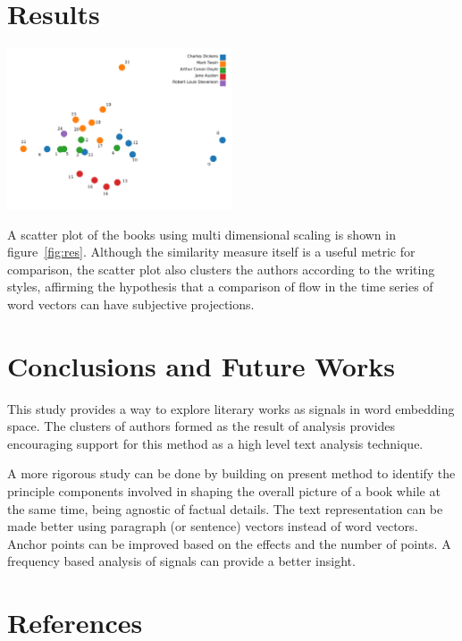 \documentclass[%
 aip,
rsi,%
 amsmath,amssymb,
 reprint,%
author-year,
groupedaddress
]{revtex4-1}
\begin{document}
\section{\label{res}Results}

\begin{center}
  \includegraphics[width=0.5\textwidth]{res}
  \label{fig:res}
\end{center}

A scatter plot of the books using multi dimensional scaling is shown in figure~\ref{fig:res}. Although the similarity measure itself is a useful metric for comparison, the scatter plot also clusters the authors according to the writing styles, affirming the hypothesis that a comparison of flow in the time series of word vectors can have subjective projections.

\section{\label{conc}Conclusions and Future Works}
This study provides a way to explore literary works as signals in word embedding space. The clusters of authors formed as the result of analysis provides encouraging support for this method as a high level text analysis technique.

A more rigorous study can be done by building on present method to identify the principle components involved in shaping the overall picture of a book while at the same time, being agnostic of factual details. The text representation can be made better using paragraph (or sentence) vectors instead of word vectors. Anchor points can be improved based on the effects and the number of points. A frequency based analysis of signals can provide a better insight.

\section*{References}

\end{document}
